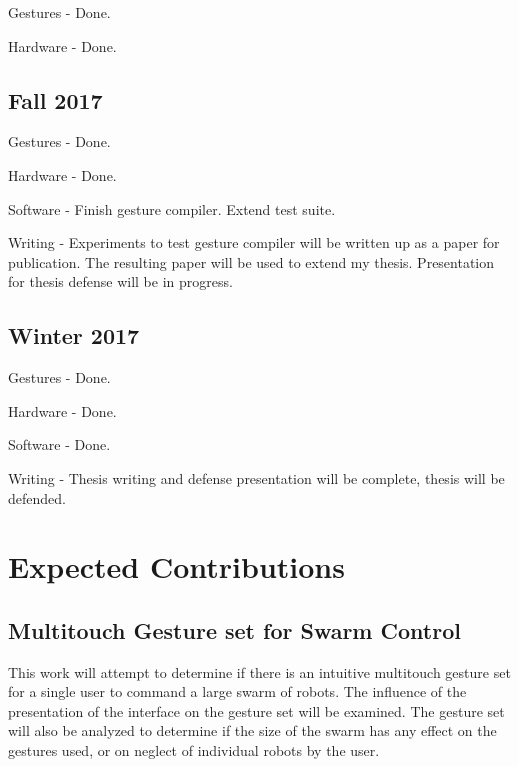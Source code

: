 \documentclass[]{article}
\begin{document}
Gestures - Done. 

Hardware - Done. 


\subsection{Fall 2017}

Gestures - Done. 

Hardware - Done. 

Software - Finish gesture compiler. Extend test suite. 

Writing - Experiments to test gesture compiler will be written up as a paper for publication. The resulting paper will be used to extend my thesis. Presentation for thesis defense will be in progress. 

\subsection{Winter 2017}

Gestures - Done. 

Hardware - Done. 

Software - Done. 

Writing - Thesis writing and defense presentation will be complete, thesis will be defended. 

\section{Expected Contributions}

\subsection{Multitouch Gesture set for Swarm Control}
This work will attempt to determine if there is an intuitive multitouch gesture set for a single user to command a large swarm of robots.
The influence of the presentation of the interface on the gesture set will be examined. 
The gesture set will also be analyzed to determine if the size of the swarm has any effect on the gestures used, or on neglect of individual robots by the user. 
\end{document}
